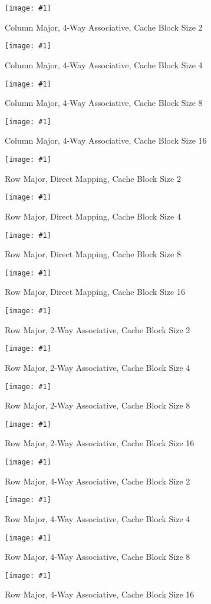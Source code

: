 \documentclass[11pt,a4paper]{article}
\newcommand{\cacheResultFigure}[3]{
\begin{figure}
	\centering
	\texttt{[image: \#1]}
	\caption{#2}
	\label{#3}
\end{figure}
}
\begin{document}
\cacheResultFigure{pictures/task4_columnMajor_4waySetAssociative2}{Column Major, 4-Way Associative, Cache Block Size 2}{fig:pic}
\cacheResultFigure{pictures/task4_columnMajor_4waySetAssociative4}{Column Major, 4-Way Associative, Cache Block Size 4}{fig:pic}
\cacheResultFigure{pictures/task4_columnMajor_4waySetAssociative8}{Column Major, 4-Way Associative, Cache Block Size 8}{fig:pic}
\cacheResultFigure{pictures/task4_columnMajor_4waySetAssociative16}{Column Major, 4-Way Associative, Cache Block Size 16}{fig:pic}


\cacheResultFigure{pictures/task4_rowMajor_directMapping2}{Row Major, Direct Mapping, Cache Block Size 2}{fig:pic}
\cacheResultFigure{pictures/task4_rowMajor_directMapping4}{Row Major, Direct Mapping, Cache Block Size 4}{fig:pic}
\cacheResultFigure{pictures/task4_rowMajor_directMapping8}{Row Major, Direct Mapping, Cache Block Size 8}{fig:pic}
\cacheResultFigure{pictures/task4_rowMajor_directMapping16}{Row Major, Direct Mapping, Cache Block Size 16}{fig:pic}

\cacheResultFigure{pictures/task4_rowMajor_2waySetAssociative2}{Row Major, 2-Way Associative, Cache Block Size 2}{fig:pic}
\cacheResultFigure{pictures/task4_rowMajor_2waySetAssociative4}{Row Major, 2-Way Associative, Cache Block Size 4}{fig:pic}
\cacheResultFigure{pictures/task4_rowMajor_2waySetAssociative8}{Row Major, 2-Way Associative, Cache Block Size 8}{fig:pic}
\cacheResultFigure{pictures/task4_rowMajor_2waySetAssociative16}{Row Major, 2-Way Associative, Cache Block Size 16}{fig:pic}

\cacheResultFigure{pictures/task4_rowMajor_4waySetAssociative2}{Row Major, 4-Way Associative, Cache Block Size 2}{fig:pic}
\cacheResultFigure{pictures/task4_rowMajor_4waySetAssociative4}{Row Major, 4-Way Associative, Cache Block Size 4}{fig:pic}
\cacheResultFigure{pictures/task4_rowMajor_4waySetAssociative8}{Row Major, 4-Way Associative, Cache Block Size 8}{fig:pic}
\cacheResultFigure{pictures/task4_rowMajor_4waySetAssociative16}{Row Major, 4-Way Associative, Cache Block Size 16}{fig:pic}






\newpage
\nocite{*}
\printbibliography

\end{document}
